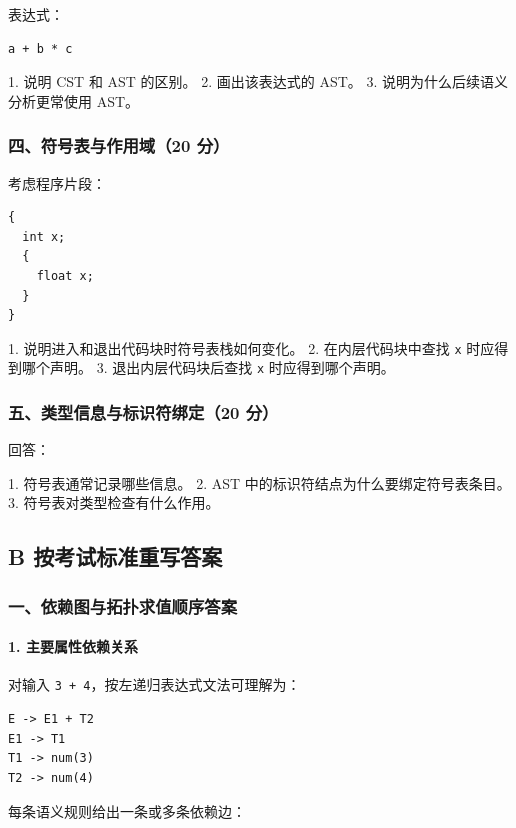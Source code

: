 \documentclass[UTF8]{ctexart}
\begin{document}
表达式：

\begin{Verbatim}[fontsize=\small,breaklines=true]
a + b * c
\end{Verbatim}

1. 说明 CST 和 AST 的区别。 2. 画出该表达式的 AST。 3. 说明为什么后续语义分析更常使用 AST。

\subsubsection*{四、符号表与作用域（20 分）}

考虑程序片段：

\begin{Verbatim}[fontsize=\small,breaklines=true]
{
  int x;
  {
    float x;
  }
}
\end{Verbatim}

1. 说明进入和退出代码块时符号表栈如何变化。 2. 在内层代码块中查找 \texttt{x} 时应得到哪个声明。 3. 退出内层代码块后查找 \texttt{x} 时应得到哪个声明。

\subsubsection*{五、类型信息与标识符绑定（20 分）}

回答：

1. 符号表通常记录哪些信息。 2. AST 中的标识符结点为什么要绑定符号表条目。 3. 符号表对类型检查有什么作用。

\subsection*{B 按考试标准重写答案}

\subsubsection*{一、依赖图与拓扑求值顺序答案}

\paragraph*{1. 主要属性依赖关系}

对输入 \texttt{3 + 4}，按左递归表达式文法可理解为：

\begin{Verbatim}[fontsize=\small,breaklines=true]
E -> E1 + T2
E1 -> T1
T1 -> num(3)
T2 -> num(4)
\end{Verbatim}

每条语义规则给出一条或多条依赖边：
\end{document}
